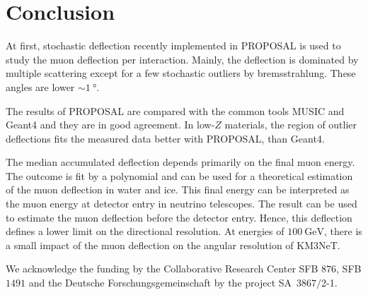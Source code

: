 \documentclass[pdflatex, sn-mathphys]{sn-jnl}%
\theoremstyle{thmstyleone}%
\theoremstyle{thmstyletwo}%
\theoremstyle{thmstylethree}%
\begin{document}
\section{Conclusion}\label{sec:conclusion}

At first, stochastic deflection recently implemented in PROPOSAL is 
used to study the muon deflection per interaction. Mainly, the deflection 
is dominated by multiple scattering except for a few stochastic 
outliers by bremsstrahlung. These angles are lower $\sim\SI{1}{\degree}$. 

The results of PROPOSAL are compared with the common tools MUSIC and 
Geant4 and they are in good agreement. In low-$Z$ materials, the region of outlier 
deflections fits the measured data better with PROPOSAL, than Geant4.

The median accumulated deflection depends primarily on the final muon energy. 
The outcome is fit by a polynomial and can be used for 
a theoretical estimation of the muon deflection in water and ice.
This final energy can be interpreted as the muon energy at detector entry 
in neutrino telescopes. 
The result can 
be used to estimate the muon deflection before the detector entry.
Hence, this deflection defines a lower limit on the directional resolution.
At energies of $\SI{100}{\giga\electronvolt}$, there is a small impact of the muon deflection on the angular 
resolution of KM3NeT.


\backmatter


We acknowledge the funding by the Collaborative Research Center SFB $876$, SFB $1491$ 
and the Deutsche Forschungsgemeinschaft by the project SA~$3867/$2-1.




\end{document}
